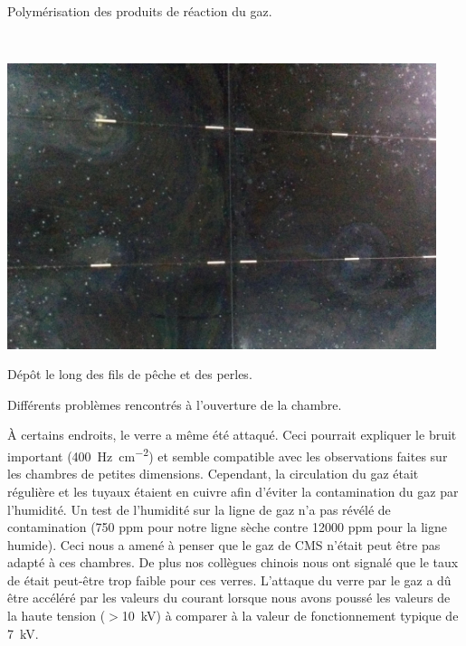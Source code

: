 \begin{minipage}[th!]{1\textwidth}
\begin{minipage}[th!]{0.48\textwidth}
\begin{minipage}[th!]{1\textwidth}
		\renewcommand\thesubfigure{(\alph{subfigure})}
		\captionsetup{type=subfigure}\caption{Polymérisation des produits de réaction du gaz.}
		\label{depot2}
	\end{minipage}%
		\\
			\begin{minipage}[th!]{1\textwidth}
			\noindent
			\centering
			\includegraphics[width=0.94\textwidth]{GLA/perle.jpg}
			\renewcommand\thesubfigure{(\alph{subfigure})}
			\captionsetup{type=subfigure}\caption{Dépôt le long des fils de pêche et des perles.}
			\label{perle}
		\end{minipage}%
	\end{minipage}%
	\addtocounter{figure}{-1}
	\captionsetup{type=figure}\caption{Différents problèmes rencontrés à l'ouverture de la chambre.}
	\label{probs}
\end{minipage}%

 À certains endroits, le verre a même été attaqué. Ceci pourrait expliquer le bruit important (\SI{400}{\hertz\per\square\centi\meter}) et semble compatible avec les observations faites sur les chambres de petites dimensions. Cependant, la circulation du gaz était régulière et les tuyaux étaient en cuivre afin d'éviter la contamination du gaz par l'humidité. Un test de l'humidité sur la ligne de gaz n'a pas révélé de contamination (\num{750} ppm pour notre ligne sèche contre \num{12000} ppm pour la ligne humide). Ceci nous a amené à penser que le gaz de CMS n'était peut être pas adapté à ces chambres. De plus nos collègues chinois nous ont signalé que le taux de  était peut-être trop faible pour ces verres. L'attaque du verre par le gaz a dû être accéléré par les valeurs du courant lorsque nous avons poussé les valeurs de la haute tension ($>$\SI{10}{\kilo\volt}) à comparer à la valeur de fonctionnement typique de \SI{7}{\kilo\volt}.
 
